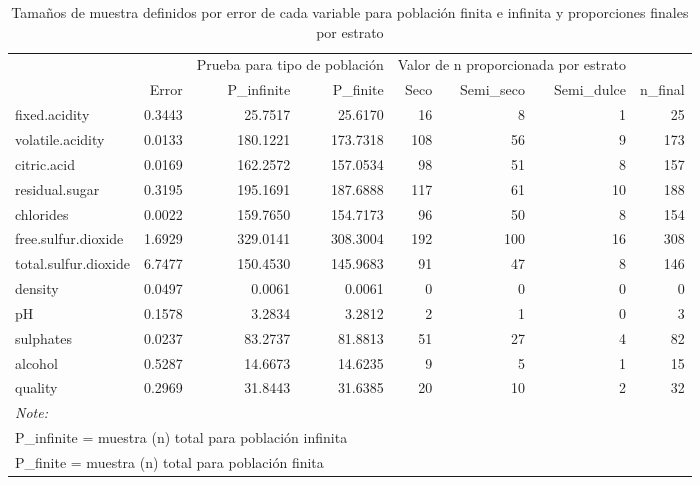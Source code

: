 \documentclass[
]{article}
\begin{document}
\begin{table}[!h]

\caption{\label{tab:tabla_errores_varall}Tamaños de muestra definidos por error de cada variable para población finita e infinita y proporciones finales por estrato}
\centering
\fontsize{8}{10}\selectfont
\begin{tabular}[t]{lrrrrrrr}
\toprule
\multicolumn{1}{c}{ } & \multicolumn{1}{c}{} & \multicolumn{2}{c}{Prueba para tipo de población} & \multicolumn{3}{c}{Valor de n proporcionada por estrato} & \multicolumn{1}{c}{} \\
\cmidrule(l{3pt}r{3pt}){3-4} \cmidrule(l{3pt}r{3pt}){5-7}
  & Error & P\_infinite & P\_finite & Seco & Semi\_seco & Semi\_dulce & n\_final\\
\midrule
\rowcolor{gray!6}  fixed.acidity & 0.3443 & 25.7517 & 25.6170 & 16 & 8 & 1 & 25\\
volatile.acidity & 0.0133 & 180.1221 & 173.7318 & 108 & 56 & 9 & 173\\
\rowcolor{gray!6}  citric.acid & 0.0169 & 162.2572 & 157.0534 & 98 & 51 & 8 & 157\\
residual.sugar & 0.3195 & 195.1691 & 187.6888 & 117 & 61 & 10 & 188\\
\rowcolor{gray!6}  chlorides & 0.0022 & 159.7650 & 154.7173 & 96 & 50 & 8 & 154\\
\addlinespace
free.sulfur.dioxide & 1.6929 & 329.0141 & 308.3004 & 192 & 100 & 16 & 308\\
\rowcolor{gray!6}  total.sulfur.dioxide & 6.7477 & 150.4530 & 145.9683 & 91 & 47 & 8 & 146\\
density & 0.0497 & 0.0061 & 0.0061 & 0 & 0 & 0 & 0\\
\rowcolor{gray!6}  pH & 0.1578 & 3.2834 & 3.2812 & 2 & 1 & 0 & 3\\
sulphates & 0.0237 & 83.2737 & 81.8813 & 51 & 27 & 4 & 82\\
\addlinespace
\rowcolor{gray!6}  alcohol & 0.5287 & 14.6673 & 14.6235 & 9 & 5 & 1 & 15\\
quality & 0.2969 & 31.8443 & 31.6385 & 20 & 10 & 2 & 32\\
\bottomrule
\multicolumn{8}{l}{\textit{Note: }}\\
\multicolumn{8}{l}{P\_infinite = muestra (n) total para población infinita}\\
\multicolumn{8}{l}{P\_finite = muestra (n) total para población finita}\\
\end{tabular}
\end{table}
\end{document}
